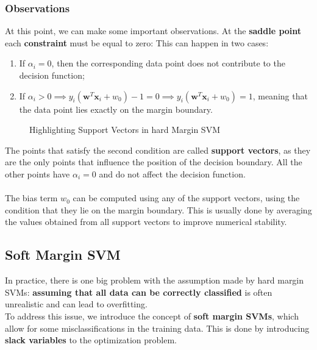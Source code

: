 \subsubsection{Observations}
At this point, we can make some important observations. At the \textbf{saddle point} each \textbf{constraint}
must be equal to zero:
This can happen in two cases:
\begin{enumerate}
    \item If $\alpha_i = 0$, then the corresponding data point does not contribute to the decision function;
    \item If $\alpha_i > 0 \implies y_i (\boldsymbol{w}^T \boldsymbol{x}_i + w_0) - 1 = 0 \implies y_i (\boldsymbol{w}^T \boldsymbol{x}_i + w_0) = 1$, meaning that the data point lies exactly on the margin boundary.
\end{enumerate}
\begin{figure}[H]
    \label{fig:svm_margin_support_vectors}
    \caption{Highlighting Support Vectors in hard Margin SVM}
\end{figure}
The points that satisfy the second condition are called \textbf{support vectors}, as they are the only points that influence the position of the decision boundary.
All the other points have $\alpha_i = 0$ and do not affect the decision function.
\\\\The bias term $w_0$ can be computed using any of the support vectors, using the condition that they lie on the margin boundary.
This is usually done by averaging the values obtained from all support vectors to improve numerical stability.

\subsection{Soft Margin SVM}
In practice, there is one big problem with the assumption made by hard margin SVMs: 
\textbf{assuming that all data can be correctly classified} is often unrealistic and can lead to overfitting.
\\To address this issue, we introduce the concept of \textbf{soft margin SVMs}, which allow for some misclassifications in the training data.
This is done by introducing \textbf{slack variables} to the optimization problem.
